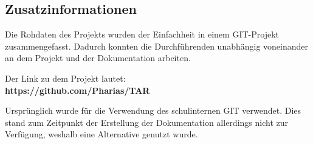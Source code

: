 \subsection{Zusatzinformationen}
Die Rohdaten des Projekts wurden der Einfachheit in einem GIT-Projekt zusammengefasst. Dadurch konnten die Durchführenden unabhängig voneinander an dem Projekt und der Dokumentation arbeiten.\par
Der Link zu dem Projekt lautet:\\
\textbf{https://github.com/Pharias/TAR}\par
Ursprünglich wurde für die Verwendung des schulinternen GIT verwendet. Dies stand zum Zeitpunkt der Erstellung der Dokumentation allerdings nicht zur Verfügung, weshalb eine Alternative genutzt wurde.
